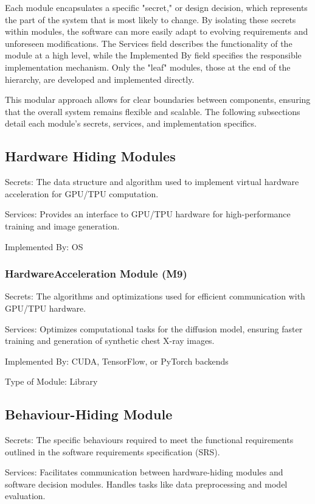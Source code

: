 \documentclass[12pt, titlepage]{article}
\begin{document}
Each module encapsulates a specific "secret," or design decision, which represents the part of the system that is most likely to change. By isolating these secrets within modules, the software can more easily adapt to evolving requirements and unforeseen modifications. The Services field describes the functionality of the module at a high level, while the Implemented By field specifies the responsible implementation mechanism. Only the "leaf" modules, those at the end of the hierarchy, are developed and implemented directly.

This modular approach allows for clear boundaries between components, ensuring that the overall system remains flexible and scalable. The following subsections detail each module's secrets, services, and implementation specifics.

\subsection{Hardware Hiding Modules}

Secrets: The data structure and algorithm used to implement virtual hardware acceleration for GPU/TPU computation.

Services: Provides an interface to GPU/TPU hardware for high-performance training and image generation.

Implemented By: OS

\subsubsection{HardwareAcceleration Module (M9)}
Secrets: The algorithms and optimizations used for efficient communication with GPU/TPU hardware.

Services: Optimizes computational tasks for the diffusion model, ensuring faster training and generation of synthetic chest X-ray images.

Implemented By: CUDA, TensorFlow, or PyTorch backends

Type of Module: Library


\subsection{Behaviour-Hiding Module}
Secrets: The specific behaviours required to meet the functional requirements outlined in the software requirements specification (SRS).

Services: Facilitates communication between hardware-hiding modules and software decision modules. 
Handles tasks like data preprocessing and model evaluation.
\end{document}
